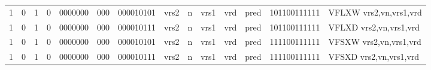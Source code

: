 \begin{landscape}
\begin{table}[p]
\begin{small}
\begin{center}
\begin{tabular}{p{0.08in}@{}p{0.08in}@{}p{0.08in}@{}p{0.08in}@{}p{0.50in}@{}p{0.30in}@{}p{0.08in}@{}p{0.8in}@{}p{0.48in}@{}p{0.32in}@{}p{0.08in}@{}p{0.8in}@{}p{0.8in}@{}p{0.4in}@{}p{0.56in}l}
\multicolumn{1}{|c|}{1} &
\multicolumn{1}{c|}{0} &
\multicolumn{1}{c|}{1} &
\multicolumn{1}{c|}{0} &
\multicolumn{1}{c|}{0000000} &
\multicolumn{1}{c|}{000} &
\multicolumn{2}{c|}{000010101} &
\multicolumn{2}{c|}{vrs2} &
\multicolumn{1}{c|}{n} &
\multicolumn{1}{c|}{vrs1} &
\multicolumn{1}{c|}{vrd} &
\multicolumn{1}{c|}{pred} &
\multicolumn{1}{c|}{101100111111} & VFLXW vrs2,vn,vrs1,vrd \\
\cline{1-15}
  

\multicolumn{1}{|c|}{1} &
\multicolumn{1}{c|}{0} &
\multicolumn{1}{c|}{1} &
\multicolumn{1}{c|}{0} &
\multicolumn{1}{c|}{0000000} &
\multicolumn{1}{c|}{000} &
\multicolumn{2}{c|}{000010111} &
\multicolumn{2}{c|}{vrs2} &
\multicolumn{1}{c|}{n} &
\multicolumn{1}{c|}{vrs1} &
\multicolumn{1}{c|}{vrd} &
\multicolumn{1}{c|}{pred} &
\multicolumn{1}{c|}{101100111111} & VFLXD vrs2,vn,vrs1,vrd \\
\cline{1-15}
  

\multicolumn{1}{|c|}{1} &
\multicolumn{1}{c|}{0} &
\multicolumn{1}{c|}{1} &
\multicolumn{1}{c|}{0} &
\multicolumn{1}{c|}{0000000} &
\multicolumn{1}{c|}{000} &
\multicolumn{2}{c|}{000010101} &
\multicolumn{2}{c|}{vrs2} &
\multicolumn{1}{c|}{n} &
\multicolumn{1}{c|}{vrs1} &
\multicolumn{1}{c|}{vrd} &
\multicolumn{1}{c|}{pred} &
\multicolumn{1}{c|}{111100111111} & VFSXW vrs2,vn,vrs1,vrd \\
\cline{1-15}
  

\multicolumn{1}{|c|}{1} &
\multicolumn{1}{c|}{0} &
\multicolumn{1}{c|}{1} &
\multicolumn{1}{c|}{0} &
\multicolumn{1}{c|}{0000000} &
\multicolumn{1}{c|}{000} &
\multicolumn{2}{c|}{000010111} &
\multicolumn{2}{c|}{vrs2} &
\multicolumn{1}{c|}{n} &
\multicolumn{1}{c|}{vrs1} &
\multicolumn{1}{c|}{vrd} &
\multicolumn{1}{c|}{pred} &
\multicolumn{1}{c|}{111100111111} & VFSXD vrs2,vn,vrs1,vrd \\
\cline{1-15}
  

\end{tabular}
\end{center}
\end{small}

\label{instr-table}
\end{table}
\end{landscape}
\restoregeometry
  

\newpage

